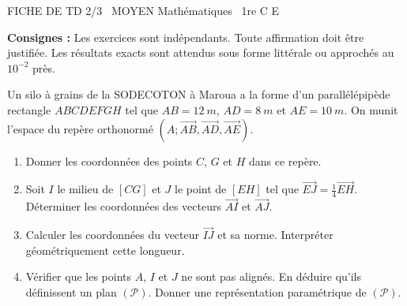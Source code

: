 \documentclass[11pt]{article}
\begin{document}
\begin{tcolorbox}[enhanced,colback=popink,colframe=popink,arc=10pt,boxrule=0pt,left=12pt,right=12pt,top=9pt,bottom=9pt]
{\color{white}\popxbold\small FICHE DE TD 2/3 \textbullet\ MOYEN \hfill Mathématiques \textbullet\ 1re C E\par}
\end{tcolorbox}
\vspace{4pt}
\noindent\textbf{Consignes :} Les exercices sont indépendants. Toute affirmation doit être justifiée. Les résultats exacts sont attendus sous forme littérale ou approchés au $10^{-2}$ près.

\begin{exercice}
Un silo à grains de la SODECOTON à Maroua a la forme d'un parallélépipède rectangle $ABCDEFGH$ tel que $AB = \SI{12}{m}$, $AD = \SI{8}{m}$ et $AE = \SI{10}{m}$. On munit l'espace du repère orthonormé $(A; \overrightarrow{AB}, \overrightarrow{AD}, \overrightarrow{AE})$.
\begin{enumerate}
    \item Donner les coordonnées des points $C$, $G$ et $H$ dans ce repère.
    \item Soit $I$ le milieu de $[CG]$ et $J$ le point de $[EH]$ tel que $\overrightarrow{EJ} = \frac{1}{4}\overrightarrow{EH}$. Déterminer les coordonnées des vecteurs $\overrightarrow{AI}$ et $\overrightarrow{AJ}$.
    \item Calculer les coordonnées du vecteur $\overrightarrow{IJ}$ et sa norme. Interpréter géométriquement cette longueur.
    \item Vérifier que les points $A$, $I$ et $J$ ne sont pas alignés. En déduire qu'ils définissent un plan $(\mathcal{P})$. Donner une représentation paramétrique de $(\mathcal{P})$.
\end{enumerate}
\end{exercice}
\end{document}
